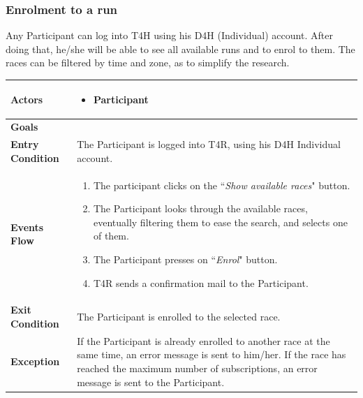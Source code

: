         \subsubsection{Enrolment to a run}
            Any Participant can log into T4H using his D4H (Individual) account. After doing that, he/she will be able to see all available runs and to enrol to them. The races can be filtered by time and zone, as to simplify the research.
            
            \begin{table}[H]
            	\centering
                
                \begin{tabular}{|p{3cm}|p{8.2cm}|}
                    \hline
                    \textbf{Actors} & \begin{itemize}
                        \item Participant
                    \end{itemize} \\
                     \hline
                    \textbf{Goals} & \\ 
                     \hline
                    \textbf{Entry Condition} & The Participant is logged into T4R, using his D4H Individual account. \\
                     \hline
                    \textbf{Events Flow} & \begin{enumerate}
                                                \item The participant clicks on the ``\emph{Show available races}" button.
                                                \item The Participant looks through the available races, eventually filtering them to ease the search, and selects one of them.
                                                \item The Participant presses on ``\emph{Enrol}" button.
                                                \item T4R sends a confirmation mail to the Participant.
                                            \end{enumerate}\\
                     \hline
                    \textbf{Exit Condition} & The Participant is enrolled to the selected race.\\
                     \hline
                    \textbf{Exception} & If the Participant is already enrolled to another race at the same time, an                          error message is sent to him/her. \newline
                                         If the race has reached the maximum number of subscriptions, an error message is sent to the Participant. \\
                     \hline
                \end{tabular}  
            \end{table}            
            
